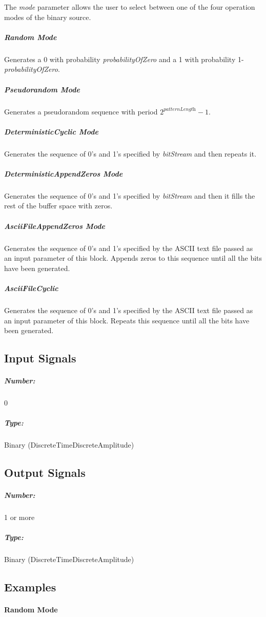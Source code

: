 The \textit{mode} parameter allows the user to select between one of the four operation modes of the binary source.

\subparagraph*{Random Mode}
Generates a 0 with probability \textit{probabilityOfZero} and a 1 with probability 1-\textit{probabilityOfZero}.

\subparagraph*{Pseudorandom Mode}
Generates a pseudorandom sequence with period $2^\textit{patternLength}-1$.

\subparagraph*{DeterministicCyclic Mode}
Generates the sequence of 0's and 1's specified by \textit{bitStream} and then repeats it.

\subparagraph*{DeterministicAppendZeros Mode}
Generates the sequence of 0's and 1's specified by \textit{bitStream} and then it fills the rest of the buffer space with zeros.

\subparagraph*{AsciiFileAppendZeros Mode}
Generates the sequence of 0's and 1's specified by the ASCII text file passed as an input parameter of this block. Appends zeros to this sequence until all the bits have been generated.

\subparagraph*{AsciiFileCyclic}
Generates the sequence of 0's and 1's specified by the ASCII text file passed as an input parameter of this block. Repeats this sequence until all the bits have been generated.

\subsection*{Input Signals}


\subparagraph*{Number:} 0

\subparagraph*{Type:} Binary (DiscreteTimeDiscreteAmplitude)

\subsection*{Output Signals}

\subparagraph*{Number:} 1 or more

\subparagraph*{Type:} Binary (DiscreteTimeDiscreteAmplitude)

\subsection*{Examples}

\paragraph*{Random Mode}

